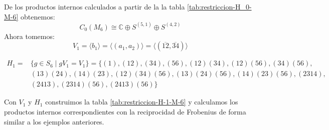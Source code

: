 \documentclass[12pt]{book}
\theoremstyle{definition}
\newcounter{in}
\begin{document}
  De los productos internos calculados a partir de la la tabla
  \ref{tab:restriccion-H_0-M-6} obtenemos:
  \begin{equation}
    C_{0}(M_{6})\cong \mathbb{C}\oplus S^{(5,1)}\oplus S^{(4,2)}
    \label{C0-M6}
  \end{equation}
  Ahora tomemos:
  \begin{equation*}
    V_{1}=\langle b_{1}\rangle =\langle
    (a_{1},a_{2})\rangle=\langle(\overline{12},\overline{34})\rangle
  \end{equation*}
  \begin{small}
    \begin{align*}
      H_{1}=&\{g \in S_{6}\mid
      gV_{1}=V_{1}\}=\{(1),(12),(34),(56),(12)(34),(12)(56),(34)(56),\\
      &(13)(24),(14)(23),(12)(34)(56),(13)(24)(56),(14)(23)(56),(2314),\\
      &(2413),(2314)(56),(2413)(56)\}
    \end{align*}
  \end{small}
  Con $V_{1}$ y $H_{1}$ construimos la tabla
  \ref{tab:restriccion-H-1-M-6} y calculamos los productos internos
  correspondientes con la reciprocidad de Frobenius de forma similar a los ejemplos anteriores.
  
\end{document}

